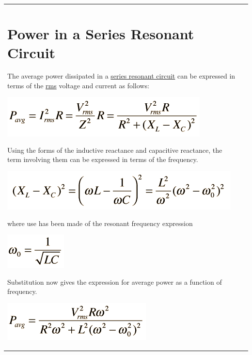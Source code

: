 \begin{longtable}[]{@{}ll@{}}
\toprule
\begin{minipage}[t]{0.48\columnwidth}\raggedright\strut
\section{Power in a Series Resonant
Circuit}\label{power-in-a-series-resonant-circuit}

The average power dissipated in a
\href{http://hyperphysics.phy-astr.gsu.edu/hbase/electric/serres.html\#c2}{series
resonant circuit} can be expressed in terms of the
\href{http://hyperphysics.phy-astr.gsu.edu/hbase/electric/acres.html\#c2}{rms}
voltage and current as follows:

\includegraphics{./Resonant RLC Circuits_files/pser.png}

Using the forms of the inductive reactance and capacitive reactance, the
term involving them can be expressed in terms of the frequency.

\includegraphics{./Resonant RLC Circuits_files/pser2.png}

where use has been made of the resonant frequency expression

\includegraphics{./Resonant RLC Circuits_files/pser3.png}

Substitution now gives the expression for average power as a function of
frequency.

\includegraphics{./Resonant RLC Circuits_files/pser4.png}


\end{minipage}
\end{longtable}
